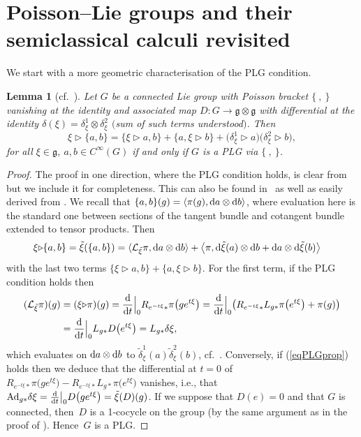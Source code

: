 \documentclass[10pt,a4paper]{amsart}
\numberwithin{equation}{section}
\newtheorem{Lemma}[Theorem]{Lemma}
\newcommand{\<}{{\langle}}
\renewcommand{\>}{{\rangle}}
\newcommand{\CL}{{\mathcal{L}}}
\newcommand{\tens}{\otimes}
\newcommand{\extd}{{\rm d}}
\newcommand{\la}{{\triangleright}}
\newcommand{\cg}{{\mathfrak{g}}}
\begin{document}
\section{Poisson--Lie groups and their semiclassical calculi revisited}\label{PLGdeform}

We start with a more geometric characterisation of the PLG condition.

\begin{Lemma}[cf.~\cite{DS,KS,Vai}] \label{PLGprop}Let $G$ be a connected Lie group with Poisson bracket $\{\ ,\ \}$ vanishing at the identity and associated map $D\colon G\to \cg\tens\cg$ with differential at the identity $\delta(\xi)=\delta_\xi^1\tens\delta_\xi^2$ $($sum of such terms understood$)$. Then
\begin{equation}\label{eqPLGprop}
\xi\triangleright\lbrace a,b\rbrace=\lbrace \xi\triangleright a,b\rbrace+\lbrace a,\xi\triangleright b\rbrace+\big(\delta_\xi^1\triangleright a\big)\big(\delta_\xi^2\triangleright b\big),
\end{equation}
for all $\xi\in\mathfrak{g}$, $a,b\in C^\infty(G)$ if and only if $G$ is a PLG via $\{\ ,\ \}$.
\end{Lemma}
\begin{proof} The proof in one direction, where the PLG condition holds, is clear from \cite{KS} but we include it for completeness. This can also be found in~\cite{DS} as well as easily derived from \cite[Proposition~10.7]{Vai}. We recall that $\lbrace a,b\rbrace(g)=\langle\pi(g),\extd a\tens\extd b\rangle$, where evaluation here is the standard one between sections of the tangent bundle and cotangent bundle extended to tensor products. Then
\begin{align*}
\xi\la\{a,b\}&=\tilde\xi(\{a,b\})=\<\CL_{\tilde\xi}\pi,\extd a\tens\extd b\>+\big\langle \pi,\extd\tilde\xi(a)\tens\extd b+\extd a\tens\extd\tilde\xi (b)\big\rangle
\end{align*}
with the last two terms $\{\xi\la a,b\}+\{a,\xi\la b\}$. For the first term, if the PLG condition holds then
\begin{align*} (\CL_{\tilde\xi}\pi)(g)&=(\xi\la\pi)(g)={\extd \over\extd t}\Big|_0 R_{e^{-t\xi}*}\pi\big(ge^{t\xi}\big)={\extd \over\extd t}\Big|_0\big( R_{e^{-t\xi}*}L_{g*}\pi\big(e^{t\xi}\big)+\pi(g) \big)\\
&={\extd \over\extd t}\Big|_0 L_{g*}D\big(e^{t\xi}\big)=L_{g*}\delta\xi,\end{align*}
which evaluates on $\extd a\tens\extd b$ to $\tilde\delta^1_\xi(a)\tilde\delta^2_\xi(b)$, cf.~\cite[p.~54]{KS}. Conversely, if (\ref{eqPLGprop}) holds then we deduce that the differential at $t=0$ of $R_{e^{-t\xi}*}\pi\big(ge^{t\xi}\big)-R_{e^{-t\xi}*}L_{g*}\pi\big(e^{t\xi}\big)$ vanishes, i.e., that ${\rm Ad}_{g*}\delta\xi={\extd \over\extd t}\big|_0 D\big(g e^{t\xi}\big)=\tilde\xi(D)(g)$.
If we suppose that $D(e)=0$ and that $G$ is connected, then~$D$ is a 1-cocycle on the group (by the same argument as in the proof of \cite[Theorem~8.4.1]{Ma:book}). Hence~$G$ is a PLG.
\end{proof}
\end{document}
